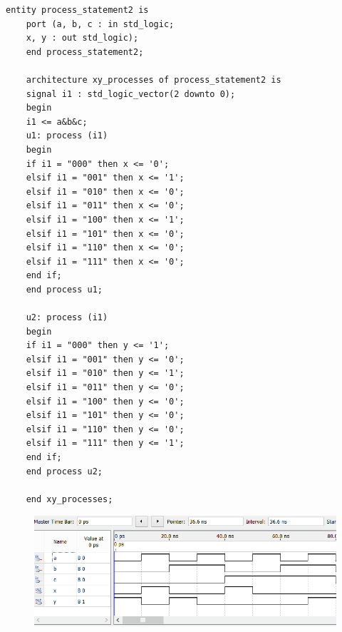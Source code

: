 \begin{enumerate}
\begin{lstlisting}[caption={Behavioral style kode for truth tabellen},label={lst:truthtab}]
	entity process_statement2 is 
	port (a, b, c : in std_logic;
	x, y : out std_logic);
	end process_statement2;
	
	architecture xy_processes of process_statement2 is
	signal i1 : std_logic_vector(2 downto 0);
	begin
	i1 <= a&b&c;
	u1: process (i1)
	begin
	if i1 = "000" then x <= '0';
	elsif i1 = "001" then x <= '1';
	elsif i1 = "010" then x <= '0';
	elsif i1 = "011" then x <= '0';
	elsif i1 = "100" then x <= '1';
	elsif i1 = "101" then x <= '0';
	elsif i1 = "110" then x <= '0';
	elsif i1 = "111" then x <= '0';
	end if;
	end process u1;
	
	u2: process (i1)
	begin
	if i1 = "000" then y <= '1';
	elsif i1 = "001" then y <= '0';
	elsif i1 = "010" then y <= '1';
	elsif i1 = "011" then y <= '0';
	elsif i1 = "100" then y <= '0';
	elsif i1 = "101" then y <= '0';
	elsif i1 = "110" then y <= '0';
	elsif i1 = "111" then y <= '1';
	end if;
	end process u2;
	
	end xy_processes;
	\end{lstlisting}
	\begin{figure}[h]
		\centering
		\includegraphics[scale=0.8]{pictures/Oevelse5/opg1/func_sim_truth.JPG}
		\caption{}
		\label{fig:Functional simulation af Truth tabel.}
	\end{figure}
\end{enumerate}